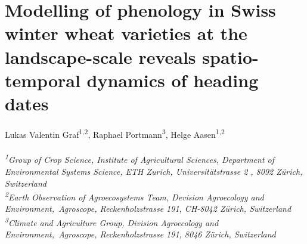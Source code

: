 \chapter{Modelling of phenology in Swiss winter wheat varieties at the landscape-scale reveals spatio-temporal dynamics of heading dates}
\label{chap:phemology}
\graphicspath{{./03-Heading-Dates/img}}

Lukas Valentin Graf\textsuperscript{1,2}, Raphael Portmann\textsuperscript{3}, Helge Aasen\textsuperscript{1,2}
\\
\normalsize
\vspace{2pt}
\\
\textit{\textsuperscript{1}Group of Crop Science, Institute of Agricultural Sciences, Department of Environmental Systems Science, ETH Zurich, Universitätstrasse 2 , 8092 Zürich, Switzerland
\\
\textsuperscript{2}Earth Observation of Agroecosystems Team, Devision Agroecology and Environment,\ Agroscope, Reckenholzstrasse 191, CH-8042 Zürich, Switzerland
\\
\textsuperscript{3}Climate and Agriculture Group, Division Agroecology and Environment,\ Agroscope, Reckenholzstrasse 191, 8046 Zürich, Switzerland
\vspace{2cm}}
\\


